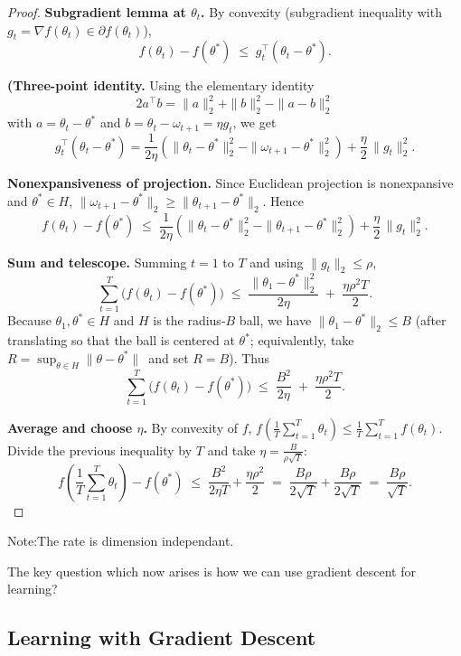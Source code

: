 \documentclass[11pt]{article}
\theoremstyle{plain}
\begin{document}
\begin{proof}
\textbf{Subgradient lemma at $\theta_t$.}
By convexity (subgradient inequality with $g_t=\nabla f(\theta_t)\in\partial f(\theta_t)$),
\[
f(\theta_t)-f(\theta^*) \;\le\; g_t^{\top}(\theta_t-\theta^*).
\]

\textbf{(Three-point identity.}
Using the elementary identity
\[
2a^{\top}b=\|a\|_2^2+\|b\|_2^2-\|a-b\|_2^2
\]
with $a=\theta_t-\theta^*$ and $b=\theta_t-\omega_{t+1}=\eta g_t$, we get
\[
g_t^{\top}(\theta_t-\theta^*)
=\frac{1}{2\eta}\!\left(\|\theta_t-\theta^*\|_2^2-\|\omega_{t+1}-\theta^*\|_2^2\right)
+\frac{\eta}{2}\,\|g_t\|_2^2.
\]

\textbf{Nonexpansiveness of projection.}
Since Euclidean projection is nonexpansive and $\theta^*\in H$,
\(
\|\omega_{t+1}-\theta^*\|_2 \ge \|\theta_{t+1}-\theta^*\|_2.
\)
Hence
\[
f(\theta_t)-f(\theta^*) \;\le\;
\frac{1}{2\eta}\!\left(\|\theta_t-\theta^*\|_2^2-\|\theta_{t+1}-\theta^*\|_2^2\right)
+\frac{\eta}{2}\,\|g_t\|_2^2.
\]

\textbf{Sum and telescope.}
Summing $t=1$ to $T$ and using $\|g_t\|_2\le \rho$,
\[
\sum_{t=1}^T \bigl(f(\theta_t)-f(\theta^*)\bigr)
\;\le\; \frac{\|\theta_1-\theta^*\|_2^2}{2\eta} \;+\; \frac{\eta\rho^2 T}{2}.
\]
Because $\theta_1,\theta^*\in H$ and $H$ is the radius-$B$ ball, we have $\|\theta_1-\theta^*\|_2\le B$ (after translating so that the ball is centered at $\theta^*$; equivalently, take $R=\sup_{\theta\in H}\|\theta-\theta^*\|\,$ and set $R=B$). Thus
\[
\sum_{t=1}^T \bigl(f(\theta_t)-f(\theta^*)\bigr)
\;\le\; \frac{B^2}{2\eta} \;+\; \frac{\eta\rho^2 T}{2}.
\]

\textbf{Average and choose $\eta$.}
By convexity of $f$,
\(
f\!\left(\frac1T\sum_{t=1}^T\theta_t\right)\le \frac1T\sum_{t=1}^T f(\theta_t).
\)
Divide the previous inequality by $T$ and take
\(\eta=\frac{B}{\rho\sqrt{T}}\):
\[
f\!\left(\frac1T\sum_{t=1}^T\theta_t\right)-f(\theta^*)
\;\le\; \frac{B^2}{2\eta T}+\frac{\eta\rho^2}{2}
\;=\; \frac{B\rho}{2\sqrt{T}}+\frac{B\rho}{2\sqrt{T}}
\;=\; \frac{B\rho}{\sqrt{T}}.
\]
\end{proof}

\small{Note:The rate is dimension independant.}

The key question which now arises is how we can use gradient descent for learning?

\subsection{Learning with Gradient Descent}
\end{document}
